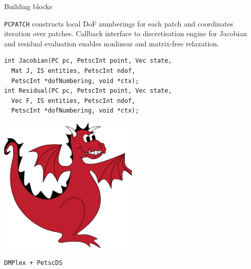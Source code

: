 \documentclass[paperwidth=60in,paperheight=36in,landscape]{baposter}
\begin{document}
\begin{poster}
\begin{posterbox}[name=config, span=2,column=2, height=1]{Building blocks}
    \begin{tcolorbox}[title={Jacobian and residual evaluation},
      halign=left]
      \begin{minipage}[t]{0.75\linewidth}
        {\raggedright \texttt{PCPATCH} constructs local DoF numberings for each
          patch and coordinates iteration over patches. Callback
          interface to discretisation engine for Jacobian and residual
          evaluation enables nonlinear and matrix-free relaxation.\par}
\begin{verbatim}
int Jacobian(PC pc, PetscInt point, Vec state, 
  Mat J, IS entities, PetscInt ndof, 
  PetscInt *dofNumbering, void *ctx);
int Residual(PC pc, PetscInt point, Vec state, 
  Vec F, IS entities, PetscInt ndof, 
  PetscInt *dofNumbering, void *ctx);
\end{verbatim}
      \end{minipage}
      \hfill
      \begin{minipage}[t]{0.24\linewidth}
        \strut\vspace*{-\baselineskip}\newline
        {\centering
          \includegraphics[width=0.5\textwidth]{firedrake-noword}
          \par
        }
        \vspace{0.5\baselineskip}
        {\centering
          \texttt{DMPlex + PetscDS}
          \vspace{0.5\baselineskip}

}
\end{minipage}
\end{tcolorbox}
\end{posterbox}
\end{poster}
\end{document}
